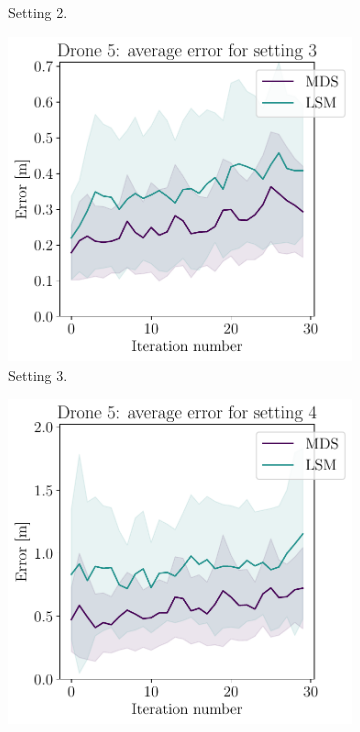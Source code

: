 \begin{figure}[!ht]
\begin{subfigure}[b]{0.28\textwidth}
         \caption{Setting 2.}
         \label{fig:setting2_drone5}
     \end{subfigure}
     \hfill%
      \begin{subfigure}[b]{0.28\textwidth}
         \centering
         \includegraphics[width=\textwidth]{figures/drone5_setting3.pdf}
         \caption{Setting 3.}
         \label{fig:setting3_drone5}
     \end{subfigure}
     \hfill
     \begin{subfigure}[b]{0.28\textwidth}
         \centering
         \includegraphics[width=\textwidth]{figures/drone5_setting4.pdf}

\end{subfigure}
\end{figure}
